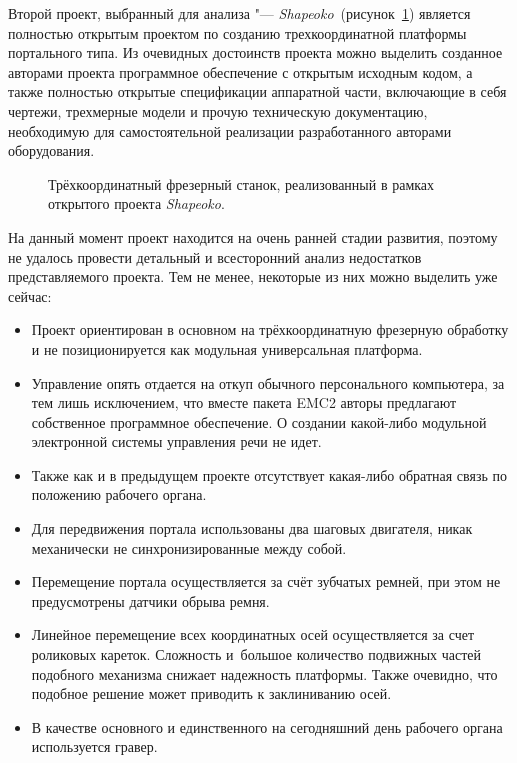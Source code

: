 Второй проект, выбранный для анализа "--- \textit{Shapeoko}~(рисунок~\cref{fig:shapeoko}) является полностью открытым проектом по созданию трехкоординатной платформы портального типа. Из очевидных достоинств проекта можно выделить созданное авторами проекта программное обеспечение с открытым исходным кодом, а также полностью открытые спецификации аппаратной части, включающие в себя чертежи, трехмерные модели и прочую техническую документацию, необходимую для самостоятельной реализации разработанного авторами оборудования.

\begin{figure}[ht]
	\caption{Трёхкоординатный фрезерный станок, реализованный в рамках открытого проекта \textit{Shapeoko}.}\label{fig:shapeoko}
\end{figure}

На данный момент проект находится на очень ранней стадии развития, поэтому не удалось провести детальный и всесторонний анализ недостатков представляемого проекта. Тем не менее, некоторые из них можно выделить уже сейчас:
\begin{itemize}
	\item Проект ориентирован в основном на трёхкоординатную фрезерную обработку и не позиционируется как модульная универсальная платформа.
	
	\item Управление опять отдается на откуп обычного персонального компьютера, за тем лишь исключением, что вместе пакета EMC2 авторы предлагают собственное программное обеспечение. О создании какой-либо модульной электронной системы управления речи не идет.
	
	\item Также как и в предыдущем проекте отсутствует какая-либо обратная связь по положению рабочего органа.
	
	\item Для передвижения портала использованы два шаговых двигателя, никак механически не синхронизированные между собой.
	
	\item Перемещение портала осуществляется за счёт зубчатых ремней, при этом не предусмотрены датчики обрыва ремня.
	
	\item Линейное перемещение всех координатных осей осуществляется за счет роликовых кареток. Сложность и~большое количество подвижных частей подобного механизма снижает надежность платформы. Также очевидно, что подобное решение может приводить к заклиниванию осей.
	
	\item В качестве основного и единственного на сегодняшний день рабочего органа используется гравер.
\end{itemize}

